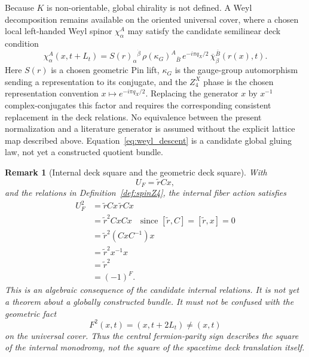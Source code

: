 \documentclass[11pt]{article}
\theoremstyle{canonmath}
\newtheorem{remark}[theorem]{Remark}
\theoremstyle{canonpostulate}
\theoremstyle{canonclaim}
\providecommand{\Klein}{\mathcal{K}}
\def\mathbb#1{#1}%
\def\mathcal#1{#1}%
\begin{document}
Because $\Klein$ is non-orientable, global chirality is not defined. A Weyl decomposition remains available on the oriented universal cover, where a chosen local left-handed Weyl spinor $\chi_\alpha^A$ may satisfy the candidate semilinear deck condition
\begin{equation}
\chi_\alpha^A(x,t+L_t)
=
S(r)_\alpha{}^{\dot\beta}
\,\rho(\kappa_G)^A{}_{\bar B}
\,e^{-i\pi q_X/2}
\,\overline{\chi}_{\dot\beta}^{\bar B}(r(x),t).
\label{eq:weyl_descent}
\end{equation}
Here $S(r)$ is a chosen geometric Pin lift, $\kappa_G$ is the gauge-group automorphism sending a representation to its conjugate, and the $\mathbb Z_4^X$ phase is the chosen representation convention $x\mapsto e^{-i\pi q_X/2}$. Replacing the generator $x$ by $x^{-1}$ complex-conjugates this factor and requires the corresponding consistent replacement in the deck relations. No equivalence between the present normalization and a literature generator is assumed without the explicit lattice map described above. Equation~\eqref{eq:weyl_descent} is a candidate global gluing law, not yet a constructed quotient bundle.

\begin{remark}[Internal deck square and the geometric deck square] \label{rem:F2}
With
\begin{equation}
U_F=\widetilde r Cx,
\end{equation}
and the relations in Definition~\ref{def:spinZ4}, the internal fiber action satisfies
\begin{align}
U_F^2
&=\widetilde r Cx\,\widetilde r Cx\\
&=\widetilde r^2 CxCx
\quad\text{since }[\widetilde r,C]=[\widetilde r,x]=0\\
&=\widetilde r^2 (CxC^{-1})x\\
&=\widetilde r^2 x^{-1}x\\
&=\widetilde r^2\\
&=(-1)^F.
\end{align}
This is an algebraic consequence of the candidate internal relations. It is not yet a theorem about a globally constructed bundle. It must not be confused with the geometric fact
\begin{equation}
F^2(x,t)=(x,t+2L_t)\neq(x,t)
\end{equation}
on the universal cover. Thus the central fermion-parity sign describes the square of the internal monodromy, not the square of the spacetime deck translation itself.
\end{remark}
\end{document}
